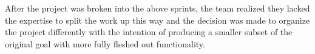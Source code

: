 After the project was broken into the above sprints, the team realized
they lacked the expertise to split the work up this way and the
decision was made to organize the project differently with the
intention of producing a smaller subset of the original goal with more
fully fleshed out functionality.


